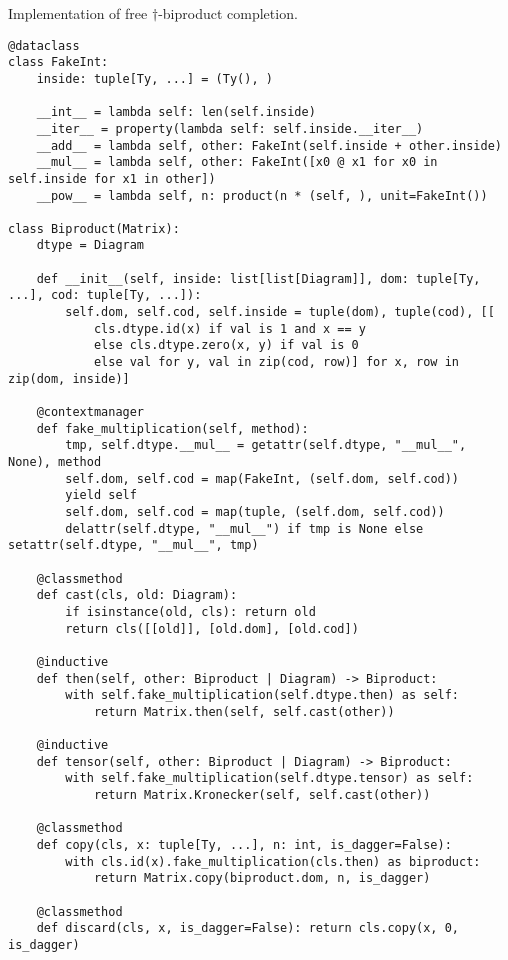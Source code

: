\begin{python}
{\normalfont Implementation of free $\dagger$-biproduct completion.}

\begin{verbatim}
@dataclass
class FakeInt:
    inside: tuple[Ty, ...] = (Ty(), )

    __int__ = lambda self: len(self.inside)
    __iter__ = property(lambda self: self.inside.__iter__)
    __add__ = lambda self, other: FakeInt(self.inside + other.inside)
    __mul__ = lambda self, other: FakeInt([x0 @ x1 for x0 in self.inside for x1 in other])
    __pow__ = lambda self, n: product(n * (self, ), unit=FakeInt())

class Biproduct(Matrix):
    dtype = Diagram

    def __init__(self, inside: list[list[Diagram]], dom: tuple[Ty, ...], cod: tuple[Ty, ...]):
        self.dom, self.cod, self.inside = tuple(dom), tuple(cod), [[
            cls.dtype.id(x) if val is 1 and x == y
            else cls.dtype.zero(x, y) if val is 0
            else val for y, val in zip(cod, row)] for x, row in zip(dom, inside)]

    @contextmanager
    def fake_multiplication(self, method):
        tmp, self.dtype.__mul__ = getattr(self.dtype, "__mul__", None), method
        self.dom, self.cod = map(FakeInt, (self.dom, self.cod))
        yield self
        self.dom, self.cod = map(tuple, (self.dom, self.cod))
        delattr(self.dtype, "__mul__") if tmp is None else setattr(self.dtype, "__mul__", tmp)

    @classmethod
    def cast(cls, old: Diagram):
        if isinstance(old, cls): return old
        return cls([[old]], [old.dom], [old.cod])

    @inductive
    def then(self, other: Biproduct | Diagram) -> Biproduct:
        with self.fake_multiplication(self.dtype.then) as self:
            return Matrix.then(self, self.cast(other))

    @inductive
    def tensor(self, other: Biproduct | Diagram) -> Biproduct:
        with self.fake_multiplication(self.dtype.tensor) as self:
            return Matrix.Kronecker(self, self.cast(other))

    @classmethod
    def copy(cls, x: tuple[Ty, ...], n: int, is_dagger=False):
        with cls.id(x).fake_multiplication(cls.then) as biproduct:
            return Matrix.copy(biproduct.dom, n, is_dagger)

    @classmethod
    def discard(cls, x, is_dagger=False): return cls.copy(x, 0, is_dagger)


\end{verbatim}
\end{python}
